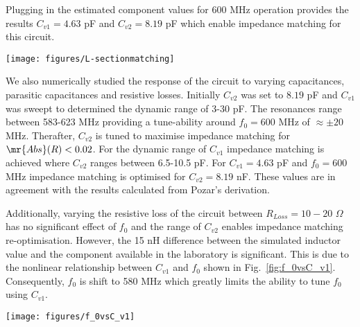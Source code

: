 \documentclass[10pt,a4paper,twoside]{article}
\begin{document}
\begin{multicols}{2}
\begin{equation}
\end{equation}
\noindent Plugging in the estimated component values for 600 MHz operation provides the results $C_{v1}=4.63$ pF and $C_{v2}=8.19$ pF which enable impedance matching for this circuit.  
\par
\begin{Figure}
\centering
\texttt{[image: figures/L-sectionmatching]}
\end{Figure}
We also numerically studied the response of the circuit to varying capacitances, parasitic capacitances and resistive losses. Initially $C_{v2}$ was set to $8.19$ pF and $C_{v1}$ was sweept to determined the dynamic range of 3-30 pF. The resonances range between 583-623 MHz providing a tune-ability around $f_{0}=600$ MHz of $\approx \pm 20$ MHz. Therafter, $C_{v2}$ is tuned to maximise impedance matching for $\mr{Abs}( R ) < 0.02$. For the dynamic range of $C_{v1}$ impedance matching is achieved where $C_{v2}$ ranges between 6.5-10.5 pF. For $C_{v1}=4.63$ pF and $f_{0}=600$ MHz impedance matching is optimised for $C_{v2}=8.19$ nF. These values are in agreement with the results calculated from Pozar's derivation. 
\par
Additionally, varying the resistive loss of the circuit between $R_{Loss}=10-20$ $\Omega$ has no significant effect of $f_{0}$ and the range of $C_{v2}$ enables impedance matching re-optimisation. However, the 15 nH difference between the simulated inductor value and the component available in the laboratory is significant. This is due to the nonlinear relationship between $C_{v1}$ and $f_{0}$ shown in Fig.~\ref{fig:f_0vsC_v1}. Consequently, $f_{0}$ is shift to 580 MHz which greatly limits the ability to tune $f_{0}$ using $C_{v1}$.  
\par
\begin{Figure}
\centering
\texttt{[image: figures/f\_0vsC\_v1]}
\label{fig:f_0vsC_v1}
\end{Figure}
\par

\end{multicols}
\end{document}
